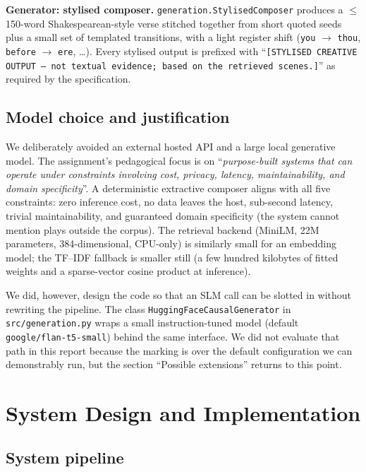 \documentclass[10pt,conference]{IEEEtran}
\begin{document}
\textbf{Generator: stylised composer.}
\verb|generation.StylisedComposer| produces a $\leq$150-word
Shakespearean-style verse stitched together from short quoted seeds
plus a small set of templated transitions, with a light register
shift (\texttt{you} $\to$ \texttt{thou}, \texttt{before} $\to$
\texttt{ere}, \ldots). Every stylised output is prefixed with
``\texttt{[STYLISED CREATIVE OUTPUT -- not textual evidence; based on
the retrieved scenes.]}'' as required by the specification.

\subsection{Model choice and justification}

We deliberately avoided an external hosted API and a large local
generative model. The assignment's pedagogical focus is on
``\emph{purpose-built systems that can operate under constraints involving
cost, privacy, latency, maintainability, and domain specificity}''.
A deterministic extractive composer aligns with all five constraints:
zero inference cost, no data leaves the host, sub-second latency,
trivial maintainability, and guaranteed domain specificity (the system
cannot mention plays outside the corpus). The retrieval backend
(MiniLM, 22M parameters, 384-dimensional, CPU-only) is similarly
small for an embedding model; the TF--IDF fallback is smaller still
(a few hundred kilobytes of fitted weights and a sparse-vector cosine
product at inference).

We did, however, design the code so that an SLM call can be slotted
in without rewriting the pipeline. The class
\verb|HuggingFaceCausalGenerator| in \verb|src/generation.py| wraps a
small instruction-tuned model (default
\verb|google/flan-t5-small|) behind the same interface. We did not
evaluate that path in this report because the marking is over the
default configuration we can demonstrably run, but the section
``Possible extensions'' returns to this point.

\section{System Design and Implementation}
\label{sec:system}


\subsection{System pipeline}
\end{document}
